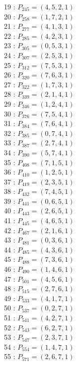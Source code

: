 \documentclass{article}
\begin{document}
{\begin{multicols}{2}
19 : $P_{245}=( 4, 5, 2, 1 )$\\
20 : $P_{258}=( 1, 7, 2, 1 )$\\
21 : $P_{277}=( 4, 1, 3, 1 )$\\
22 : $P_{285}=( 4, 2, 3, 1 )$\\
23 : $P_{305}=( 0, 5, 3, 1 )$\\
24 : $P_{307}=( 2, 5, 3, 1 )$\\
25 : $P_{312}=( 7, 5, 3, 1 )$\\
26 : $P_{320}=( 7, 6, 3, 1 )$\\
27 : $P_{322}=( 1, 7, 3, 1 )$\\
28 : $P_{339}=( 2, 1, 4, 1 )$\\
29 : $P_{346}=( 1, 2, 4, 1 )$\\
30 : $P_{376}=( 7, 5, 4, 1 )$\\
31 : $P_{384}=( 7, 6, 4, 1 )$\\
32 : $P_{385}=( 0, 7, 4, 1 )$\\
33 : $P_{387}=( 2, 7, 4, 1 )$\\
34 : $P_{390}=( 5, 7, 4, 1 )$\\
35 : $P_{408}=( 7, 1, 5, 1 )$\\
36 : $P_{410}=( 1, 2, 5, 1 )$\\
37 : $P_{419}=( 2, 3, 5, 1 )$\\
38 : $P_{432}=( 7, 4, 5, 1 )$\\
39 : $P_{441}=( 0, 6, 5, 1 )$\\
40 : $P_{443}=( 2, 6, 5, 1 )$\\
41 : $P_{445}=( 4, 6, 5, 1 )$\\
42 : $P_{467}=( 2, 1, 6, 1 )$\\
43 : $P_{481}=( 0, 3, 6, 1 )$\\
44 : $P_{485}=( 4, 3, 6, 1 )$\\
45 : $P_{488}=( 7, 3, 6, 1 )$\\
46 : $P_{490}=( 1, 4, 6, 1 )$\\
47 : $P_{501}=( 4, 5, 6, 1 )$\\
48 : $P_{515}=( 2, 7, 6, 1 )$\\
49 : $P_{533}=( 4, 1, 7, 1 )$\\
50 : $P_{537}=( 0, 2, 7, 1 )$\\
51 : $P_{541}=( 4, 2, 7, 1 )$\\
52 : $P_{543}=( 6, 2, 7, 1 )$\\
53 : $P_{547}=( 2, 3, 7, 1 )$\\
54 : $P_{554}=( 1, 4, 7, 1 )$\\
55 : $P_{571}=( 2, 6, 7, 1 )$\\
\end{multicols}
}
\end{document}
